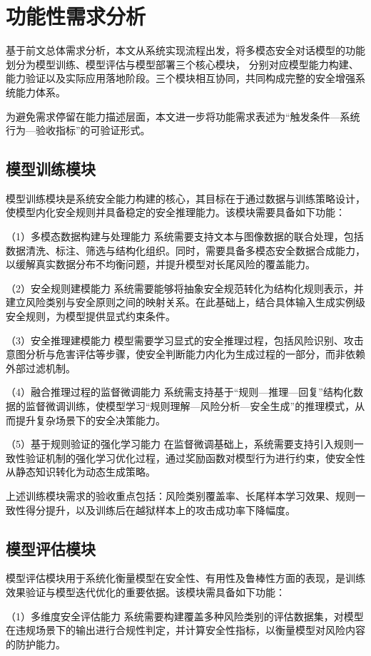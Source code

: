 \section{功能性需求分析}
基于前文总体需求分析，本文从系统实现流程出发，将多模态安全对话模型的功能划分为模型训练、模型评估与模型部署三个核心模块，
分别对应模型能力构建、能力验证以及实际应用落地阶段。三个模块相互协同，共同构成完整的安全增强系统能力体系。

为避免需求停留在能力描述层面，本文进一步将功能需求表述为“触发条件—系统行为—验收指标”的可验证形式。

\subsection{模型训练模块}
模型训练模块是系统安全能力构建的核心，其目标在于通过数据与训练策略设计，使模型内化安全规则并具备稳定的安全推理能力。该模块需要具备如下功能：

（1）多模态数据构建与处理能力
系统需要支持文本与图像数据的联合处理，包括数据清洗、标注、筛选与结构化组织。同时，需要具备多模态安全数据合成能力，以缓解真实数据分布不均衡问题，并提升模型对长尾风险的覆盖能力。

（2）安全规则建模能力
系统需要能够将抽象安全规范转化为结构化规则表示，并建立风险类别与安全原则之间的映射关系。在此基础上，结合具体输入生成实例级安全规则，为模型提供显式约束条件。

（3）安全推理建模能力
模型需要学习显式的安全推理过程，包括风险识别、攻击意图分析与危害评估等步骤，使安全判断能力内化为生成过程的一部分，而非依赖外部过滤机制。

（4）融合推理过程的监督微调能力
系统需支持基于“规则—推理—回复”结构化数据的监督微调训练，使模型学习“规则理解—风险分析—安全生成”的推理模式，从而提升复杂场景下的安全决策能力。

（5）基于规则验证的强化学习能力
在监督微调基础上，系统需要支持引入规则一致性验证机制的强化学习优化过程，通过奖励函数对模型行为进行约束，使安全性从静态知识转化为动态生成策略。

上述训练模块需求的验收重点包括：风险类别覆盖率、长尾样本学习效果、规则一致性得分提升，以及训练后在越狱样本上的攻击成功率下降幅度。

\subsection{模型评估模块}
模型评估模块用于系统化衡量模型在安全性、有用性及鲁棒性方面的表现，是训练效果验证与模型迭代优化的重要依据。该模块需具备如下功能：

（1）多维度安全评估能力
系统需要构建覆盖多种风险类别的评估数据集，对模型在违规场景下的输出进行合规性判定，并计算安全性指标，以衡量模型对风险内容的防护能力。

